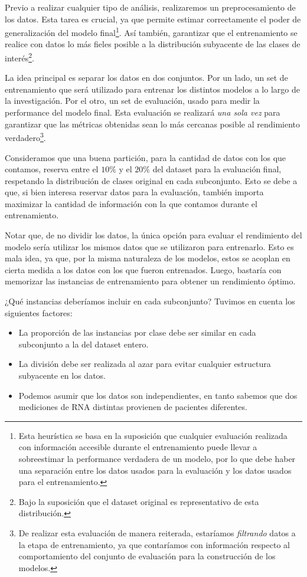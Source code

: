 Previo a realizar cualquier tipo de análisis, realizaremos un preprocesamiento de los datos. Esta tarea es crucial, ya que permite estimar correctamente el poder de generalización del modelo final\footnote{Esta heurística se basa en la suposición que cualquier evaluación realizada con información accesible durante el entrenamiento puede llevar a sobreestimar la performance verdadera de un modelo, por lo que debe haber una separación entre los datos usados para la evaluación y los datos usados para el entrenamiento.}. Así también, garantizar que el entrenamiento se realice con datos lo más fieles posible a la distribución subyacente de las clases de interés\footnote{Bajo la suposición que el dataset original es representativo de esta distribución.}. 

La idea principal es separar los datos en dos conjuntos. Por un lado, un set de entrenamiento que será utilizado para entrenar los distintos modelos a lo largo de la investigación. Por el otro, un set de evaluación, usado para medir la performance del modelo final. Esta evaluación se realizará \textit{una sola vez} para garantizar que las métricas obtenidas sean lo más cercanas posible al rendimiento verdadero\footnote{De realizar esta evaluación de manera reiterada, estaríamos \textit{filtrando} datos a la etapa de entrenamiento, ya que contaríamos con información respecto al comportamiento del conjunto de evaluación para la construcción de los modelos.}.

Consideramos que una buena partición, para la cantidad de datos con los que contamos, reserva entre el $10\%$ y el $20\%$ del dataset para la evaluación final, respetando la distribución de clases original en cada subconjunto. Esto se debe a que, si bien interesa reservar datos para la evaluación, también importa maximizar la cantidad de información con la que contamos durante el entrenamiento.

Notar que, de no dividir los datos, la única opción para evaluar el rendimiento del modelo sería utilizar los mismos datos que se utilizaron para entrenarlo. Esto es mala idea, ya que, por la misma naturaleza de los modelos, estos se acoplan en cierta medida a los datos con los que fueron entrenados. Luego, bastaría con memorizar las instancias de entrenamiento para obtener un rendimiento óptimo.

¿Qué instancias deberíamos incluir en cada subconjunto? Tuvimos en cuenta los siguientes factores:

\begin{itemize}
    \item La proporción de las instancias por clase debe ser similar en cada subconjunto a la del dataset entero.
    \item La división debe ser realizada al azar para evitar cualquier estructura subyacente en los datos.
    \item Podemos asumir que los datos son independientes, en tanto sabemos que dos mediciones de RNA distintas provienen de pacientes diferentes. 
\end{itemize}

